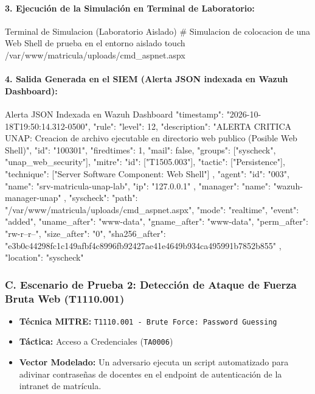 \newpage
\paragraph{3. Ejecución de la Simulación en Terminal de Laboratorio:}

\begin{cmdbox}{Terminal de Simulacion (Laboratorio Aislado)}
# Simulacion de colocacion de una Web Shell de prueba en el entorno aislado
touch /var/www/matricula/uploads/cmd_aspnet.aspx
\end{cmdbox}

\paragraph{4. Salida Generada en el SIEM (Alerta JSON indexada en Wazuh Dashboard):}

\begin{cmdbox}{Alerta JSON Indexada en Wazuh Dashboard}
{
  "timestamp": "2026-10-18T19:50:14.312-0500",
  "rule": {
    "level": 12,
    "description": "ALERTA CRITICA UNAP: Creacion de archivo ejecutable en directorio web publico (Posible Web Shell)",
    "id": "100301",
    "firedtimes": 1,
    "mail": false,
    "groups": ["syscheck", "unap_web_security"],
    "mitre": {
      "id": ["T1505.003"],
      "tactic": ["Persistence"],
      "technique": ["Server Software Component: Web Shell"]
    }
  },
  "agent": {
    "id": "003",
    "name": "srv-matricula-unap-lab",
    "ip": "127.0.0.1"
  },
  "manager": {
    "name": "wazuh-manager-unap"
  },
  "syscheck": {
    "path": "/var/www/matricula/uploads/cmd_aspnet.aspx",
    "mode": "realtime",
    "event": "added",
    "uname_after": "www-data",
    "gname_after": "www-data",
    "perm_after": "rw-r--r--",
    "size_after": "0",
    "sha256_after": "e3b0c44298fc1c149afbf4c8996fb92427ae41e4649b934ca495991b7852b855"
  },
  "location": "syscheck"
}
\end{cmdbox}

\subsubsection*{C. Escenario de Prueba 2: Detección de Ataque de Fuerza Bruta Web (T1110.001)}

\begin{itemize}
    \item \textbf{Técnica MITRE:} \texttt{T1110.001 - Brute Force: Password Guessing}
    \item \textbf{Táctica:} Acceso a Credenciales (\texttt{TA0006})
    \item \textbf{Vector Modelado:} Un adversario ejecuta un script automatizado para adivinar contraseñas de docentes en el endpoint de autenticación de la intranet de matrícula.
\end{itemize}

